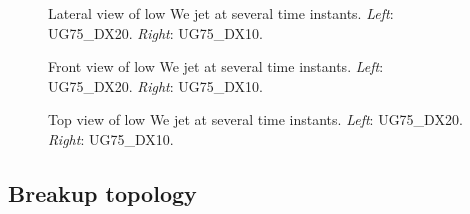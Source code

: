 \clearpage

\begin{figure}[ht]
\centering
{}
\caption[Lateral view of low We jet at several time instants. ]{Lateral view of low We jet at several time instants. \textsl{Left}: UG75\_DX20. \textsl{Right}: UG75\_DX10.}
\label{fig:JICF_establishment_UG75_lateral}
\end{figure}

\clearpage

\begin{figure}[ht]
\centering
{}
\caption[Front view of low We jet at several time instants. ]{Front view of low We jet at several time instants. \textsl{Left}: UG75\_DX20. \textsl{Right}: UG75\_DX10.}
\label{fig:JICF_establishment_UG75_front}
\end{figure}

\clearpage

\begin{figure}[ht]
\centering
{}
\caption[Top view of low We jet at several time instants. ]{Top view of low We jet at several time instants. \textsl{Left}: UG75\_DX20. \textsl{Right}: UG75\_DX10.}
\label{fig:JICF_establishment_UG75_top}
\end{figure}

\clearpage


\subsection{Breakup topology}
\label{subsec:ch5_breakup_topology}

